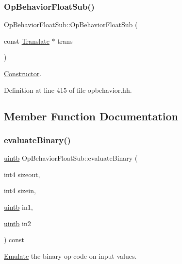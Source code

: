 \subsubsection{\texorpdfstring{OpBehaviorFloatSub()}{OpBehaviorFloatSub()}}
{\footnotesize\ttfamily Op\+Behavior\+Float\+Sub\+::\+Op\+Behavior\+Float\+Sub (\begin{DoxyParamCaption}\item[{const \mbox{\hyperlink{class_translate}{Translate}} $\ast$}]{trans }\end{DoxyParamCaption})\hspace{0.3cm}{\ttfamily [inline]}}



\mbox{\hyperlink{class_constructor}{Constructor}}. 



Definition at line 415 of file opbehavior.\+hh.



\subsection{Member Function Documentation}
\mbox{\label{class_op_behavior_float_sub_a8cb6e6a90386469b69c4c92d39ded928}} 
\subsubsection{\texorpdfstring{evaluateBinary()}{evaluateBinary()}}
{\footnotesize\ttfamily \mbox{\hyperlink{types_8h_a2db313c5d32a12b01d26ac9b3bca178f}{uintb}} Op\+Behavior\+Float\+Sub\+::evaluate\+Binary (\begin{DoxyParamCaption}\item[{int4}]{sizeout,  }\item[{int4}]{sizein,  }\item[{\mbox{\hyperlink{types_8h_a2db313c5d32a12b01d26ac9b3bca178f}{uintb}}}]{in1,  }\item[{\mbox{\hyperlink{types_8h_a2db313c5d32a12b01d26ac9b3bca178f}{uintb}}}]{in2 }\end{DoxyParamCaption}) const\hspace{0.3cm}{\ttfamily [virtual]}}



\mbox{\hyperlink{class_emulate}{Emulate}} the binary op-\/code on input values. 


